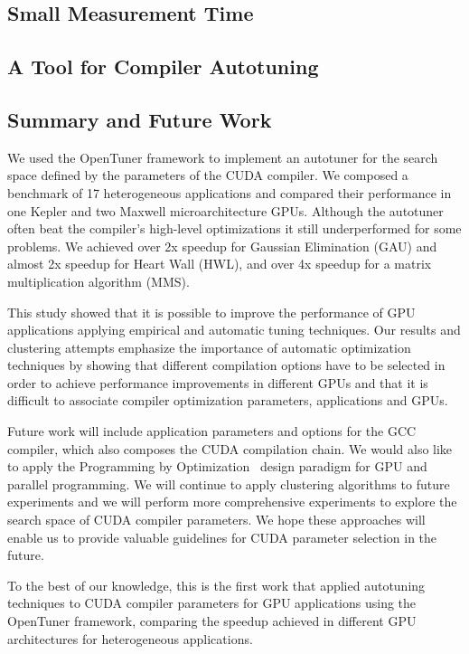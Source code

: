 \subsection{Small Measurement Time}
\label{subsec:smalltime}

\subsection{A Tool for Compiler Autotuning}


\subsection{Summary and Future Work}
\label{subsec:GPUconcl}

We used the OpenTuner framework to implement an autotuner for the search space
defined by the parameters of the CUDA compiler. We composed a benchmark of 17
heterogeneous applications and compared their performance in one Kepler and two
Maxwell microarchitecture GPUs.  Although the autotuner often beat the
compiler’s high-level optimizations it still underperformed for some problems.
We achieved over 2x speedup for Gaussian Elimination (GAU) and almost 2x
speedup for Heart Wall (HWL),  and over 4x speedup for a matrix multiplication
algorithm (MMS).

This study showed that it is possible to improve the performance of GPU
applications applying empirical and automatic tuning techniques. Our results
and clustering attempts emphasize the importance of automatic optimization
techniques by showing that different compilation options have to be selected in
order to achieve performance improvements in different GPUs and that it is
difficult to associate compiler optimization parameters, applications and GPUs.

Future work will include application parameters and options for the GCC
compiler, which also composes the CUDA compilation chain.  We would also like
to apply the Programming by Optimization~\cite{hoos2012programming} design
paradigm for GPU and parallel programming. We will continue to apply clustering
algorithms to future experiments and we will perform more comprehensive
experiments to explore the search space of CUDA compiler parameters. We hope
these approaches will enable us to provide valuable guidelines for CUDA
parameter selection in the future.

To the best of our knowledge, this is the first work that applied autotuning
techniques to CUDA compiler parameters for GPU applications using the OpenTuner
framework, comparing the speedup achieved in different GPU architectures for
heterogeneous applications.

